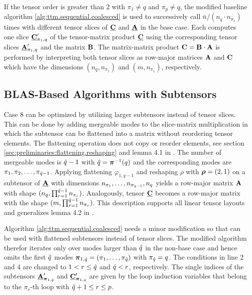 If the tensor order is greater than $2$ with $\pi_1\neq q$ and $\pi_p \neq q$, the modified baseline algorithm \ref{alg:ttm.sequential.coalesced} is used to successively call $\bar{n} / (n_q \cdot n_{\pi_1})$ times  with different tensor slices of $\underline{\mathbf{C}}$ and $\underline{\mathbf{A}}$ in the base case.
Each  computes one slice $\underline{\mathbf{C}}_{\pi_1,q}'$ of the tensor-matrix product $\underline{\mathbf{C}}$ using the corresponding tensor slices $\underline{\mathbf{A}}_{\pi_1,q}'$ and the matrix $\mathbf{B}$.
The matrix-matrix product $\mathbf{C} = \mathbf{B} \cdot \mathbf{A}$ is performed by interpreting both tensor slices as row-major matrices $\mathbf{A}$ and $\mathbf{C}$ which have the dimensions $(n_q,n_{\pi_1})$ and $(m,n_{\pi_1})$, respectively.

\subsection{BLAS-Based Algorithms with Subtensors}
\label{sec:design:blas.based.algorithm}
Case 8 can be optimized by utilizing larger subtensors instead of tensor slices.
This can be done by adding mergeable modes to the slice-matrix multiplication in which the subtensor can be flattened into a matrix without reordering tensor elements.
The flattening operation does not copy or reorder elements, see section \ref{sec:preliminaries:flattening.reshaping} and lemma 4.1 in \cite{li:2015:input}.
The number of mergeable modes is $\hat{q}-1$ with $\hat{q} = \boldsymbol{\pi}^{-1}(q)$ and the corresponding modes are $\pi_1,\pi_2,\dots,\pi_{\hat{q}-1}$.
Applying flattening $\varphi_{1,q-1}$ and reshaping $\rho$ with $\boldsymbol{\rho} = (2,1)$ on a subtensor of $\underline{\mathbf{A}}$ with dimensions $n_{\pi_1},\dots,n_{\pi_{\hat{q}-1}}, n_{q}$ yields a row-major matrix $\mathbf{A}$ with shape $(n_q,\prod_{r=1}^{\hat{q}-1} n_{\pi_r})$.
Analogously, tensor $\underline{\mathbf{C}}$ becomes a row-major matrix with the shape $(m, \prod_{r=1}^{\hat{q}-1} n_{\pi_r})$.
This description supports all linear tensor layouts and generalizes lemma 4.2 in \cite{li:2015:input}.

Algorithm \ref{alg:ttm.sequential.coalesced} needs a minor modification so that  can be used with flattened subtensors instead of tensor slices.
The modified algorithm therefor iterates only over modes larger than $\hat{q}$ in the non-base case and hence omits the first $\hat{q}$ modes $\boldsymbol{\pi}_{1,\hat{q}} = (\pi_1, \dots, \pi_{\hat{q}})$ with $\pi_{\hat{q}} = q$.
The conditions in line 2 and 4 are changed to $1 < r \leq \hat{q}$ and $\hat{q} < r$, respectively.
The single indices of the subtensors $\underline{\mathbf{A}}_{\boldsymbol{\pi}_{1,\hat{q}}}'$ and $\underline{\mathbf{C}}_{\boldsymbol{\pi}_{1,\hat{q}}}'$ are given by the loop induction variables that belong to the $\pi_r$-th loop with $\hat{q}+1 \leq r \leq p$.  %

